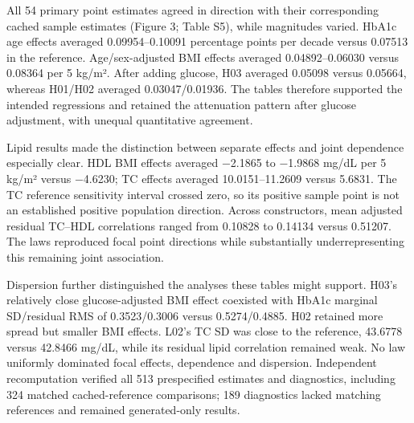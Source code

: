\documentclass[sigconf,anonymous,review]{acmart}
\begin{document}
All 54 primary point estimates agreed in direction with their corresponding cached sample estimates (Figure 3; Table S5), while magnitudes varied. HbA1c age effects averaged 0.09954–\allowbreak{}0.10091 percentage points per decade versus 0.07513 in the reference. Age/\allowbreak{}sex-adjusted BMI effects averaged 0.04892–\allowbreak{}0.06030 versus 0.08364 per 5 kg/\allowbreak{}m². After adding glucose, H03 averaged 0.05098 versus 0.05664, whereas H01/\allowbreak{}H02 averaged 0.03047/\allowbreak{}0.01936. The tables therefore supported the intended regressions and retained the attenuation pattern after glucose adjustment, with unequal quantitative agreement.


Lipid results made the distinction between separate effects and joint dependence especially clear. HDL BMI effects averaged −2.1865 to −1.9868 mg/\allowbreak{}dL per 5 kg/\allowbreak{}m² versus −4.6230; TC effects averaged 10.0151–\allowbreak{}11.2609 versus 5.6831. The TC reference sensitivity interval crossed zero, so its positive sample point is not an established positive population direction. Across constructors, mean adjusted residual TC–\allowbreak{}HDL correlations ranged from 0.10828 to 0.14134 versus 0.51207. The laws reproduced focal point directions while substantially underrepresenting this remaining joint association.


Dispersion further distinguished the analyses these tables might support. H03's relatively close glucose-adjusted BMI effect coexisted with HbA1c marginal SD/\allowbreak{}residual RMS of 0.3523/\allowbreak{}0.3006 versus 0.5274/\allowbreak{}0.4885. H02 retained more spread but smaller BMI effects. L02's TC SD was close to the reference, 43.6778 versus 42.8466 mg/\allowbreak{}dL, while its residual lipid correlation remained weak. No law uniformly dominated focal effects, dependence and dispersion. Independent recomputation verified all 513 prespecified estimates and diagnostics, including 324 matched cached-reference comparisons; 189 diagnostics lacked matching references and remained generated-only results.
\end{document}
